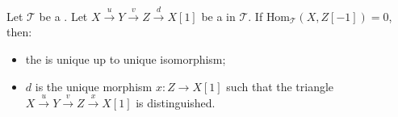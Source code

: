 \begin{corollary} \label{corollary:cone_of_a_morphism_in_a_triangulated_category_is_unique_if_no_nontrivial_backwards_morphism_exists} 
Let $\mathcal{T}$ be a . Let $X \xrightarrow{u} Y \xrightarrow{v} Z \xrightarrow{d} X[1]$ be a  in $\mathcal{T}$. If $\text{Hom}_{\mathcal{T}}(X, Z[-1]) = 0$, then:
\begin{itemize}
    \item[(i)] the  is unique up to unique isomorphism;
    \item[(ii)] $d$ is the unique morphism $x: Z \to X[1]$ such that the triangle $X \xrightarrow{u} Y \xrightarrow{v} Z \xrightarrow{x} X[1]$ is distinguished.
\end{itemize}
\end{corollary}
